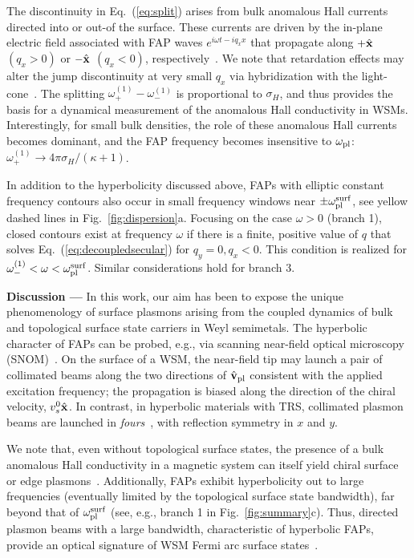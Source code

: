 \documentclass[aps,twocolumn,prl,groupedaddress]{revtex4}
\renewcommand{\vec}[1]{{\bf #1}}
\begin{document}
The discontinuity in Eq.~(\ref{eq:split}) arises from 
bulk anomalous Hall currents directed into or out-of the surface. 
These currents are driven by the in-plane electric field associated with FAP waves $e^{i\omega t - i q_x x}$ that propagate along $+\hat{\vec{x}}$ $(q_x > 0)$ or $-\hat{\vec{x}}$ $(q_x < 0)$, respectively~\cite{zyuzin,song16,hoffman16}. 
We note that retardation effects may alter the jump discontinuity at very small $q_x$ via hybridization with the light-cone~\cite{hoffman16}.
The splitting $\omega_+^{(1)} - \omega^{(1)}_-$ is proportional to $\sigma_H$, and thus provides 
the basis for a dynamical measurement of the anomalous Hall conductivity in WSMs. 
Interestingly, for small bulk densities, the role of these anomalous Hall currents becomes dominant, and the FAP frequency becomes insensitive to $\omega_{\rm pl}$: $\omega_+^{(1)} \to 4\pi \sigma_H/(\kappa+1)$.

In addition to the hyperbolicity discussed above, FAPs with elliptic constant frequency contours also occur in small frequency windows near $\pm\omega_{\rm pl}^{\rm surf}$, see yellow dashed lines in Fig.~\ref{fig:dispersion}a. Focusing on the case $\omega > 0$ (branch 1), closed contours exist at frequency $\omega$ if there is a finite, positive value of $q$ that solves Eq.~(\ref{eq:decoupledsecular}) for $q_y = 0, q_x < 0$. This condition is realized for $\omega^{(1)}_- < \omega < \omega^{\rm surf}_{\rm pl}$. Similar considerations hold for branch 3.

\vspace{2mm}
{\bf Discussion ---} 
In this work, our aim has been to expose the unique phenomenology of surface plasmons arising from the coupled dynamics of bulk and topological surface state carriers in Weyl semimetals. The hyperbolic character of FAPs can be probed, e.g., via  
scanning near-field optical microscopy (SNOM)~\cite{koppens2012,basov2012}. 
On the surface of a WSM, 
the near-field tip may launch a pair of collimated beams 
along the two directions of $\hat{\vec{v}}_{\rm pl}$ 
consistent with the applied excitation frequency; the propagation is biased along the direction of the chiral velocity, $v_s^0 \hat{\vec{x}}$.  
In contrast, in hyperbolic materials with TRS, collimated plasmon beams are launched in {\it fours}~\cite{alu,low}, with reflection symmetry in $x$ and $y$.

We note that, even without topological surface states, the presence of a bulk anomalous Hall conductivity in a magnetic system can itself 
yield chiral surface or edge plasmons~\cite{zyuzin, song16,hoffman16}. Additionally,
FAPs exhibit hyperbolicity out to large frequencies (eventually 
limited by the topological surface state bandwidth), far beyond that of $\omega_{\rm pl}^{\rm surf}$ (see, e.g., branch 1 in Fig.~\ref{fig:summary}c). 
Thus, directed plasmon beams with a large bandwidth, characteristic of hyperbolic FAPs, 
provide an optical signature of WSM Fermi arc surface states~\cite{wan}.
\end{document}
